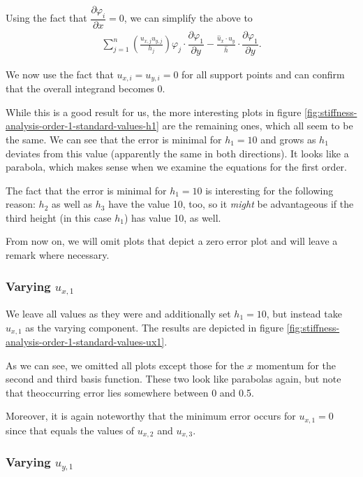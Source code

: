 \documentclass{article}
\newcommand{\pd}[2]{\dfrac{\partial #1}{\partial #2}}
\renewcommand{\phi}{\varphi}
\begin{document}
Using the fact that $\pd{\phi_i}x = 0$, we can simplify the above to
\begin{align*}
    \sum_{j=1}^n \left(\frac{u_{x,j} u_{y,j}}{h_j}\right) \phi_j
    \cdot
    \pd{\phi_1}{y} -
    \frac{\widehat{u}_x \cdot \widehat{u}_y }{\widehat{h}} \cdot \pd{\phi_1}{y}.
\end{align*}

We now use the fact that $u_{x,i}=u_{y,i}=0$ for all support points and can confirm that the overall integrand becomes 0.

While this is a good result for us, the more interesting plots in figure \ref{fig:stiffness-analysis-order-1-standard-values-h1} are the remaining ones, which all seem to be the same. We can see that the error is minimal for $h_1=10$ and grows as $h_1$ deviates from this value (apparently the same in both directions). It looks like a parabola, which makes sense when we examine the equations for the first order.

The fact that the error is minimal for $h_1=10$ is interesting for the following reason: $h_2$ as well as $h_3$ have the value 10, too, so it \emph{might} be advantageous if the third height (in this case $h_1$) has value 10, as well.

From now on, we will omit plots that depict a zero error plot and will leave a remark where necessary.

\subsubsection{\texorpdfstring{Varying $u_{x,1}$}{Varying ux1}}

We leave all values as they were and additionally set $h_1=10$, but instead take $u_{x,1}$ as the varying component. The results are depicted in figure \ref{fig:stiffness-analysis-order-1-standard-values-ux1}.



As we can see, we omitted all plots except those for the $x$ momentum for the second and third basis function. These two look like parabolas again, but note that theoccurring error lies somewhere between 0 and 0.5.

Moreover, it is again noteworthy that the minimum error occurs for $u_{x,1}=0$ since that equals the values of $u_{x,2}$ and $u_{x,3}$.

\subsubsection{\texorpdfstring{Varying $u_{y,1}$}{Varying uy1}}
\end{document}
